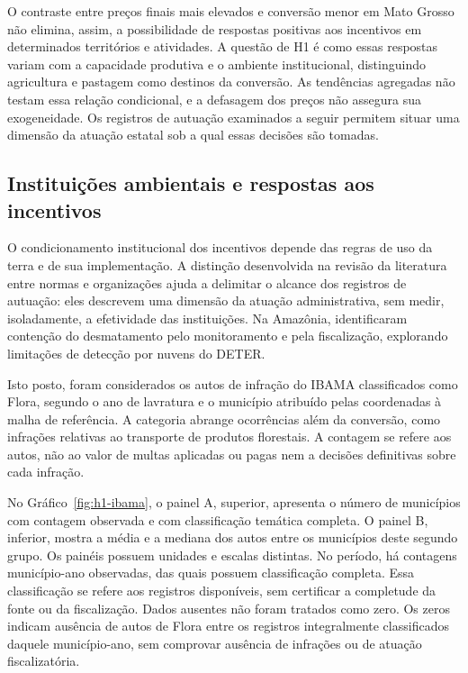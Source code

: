 O contraste entre preços finais mais elevados e conversão menor em Mato Grosso não elimina, assim, a possibilidade de respostas positivas aos incentivos em determinados territórios e atividades. A questão de H1 é como essas respostas variam com a capacidade produtiva e o ambiente institucional, distinguindo agricultura e pastagem como destinos da conversão. As tendências agregadas não testam essa relação condicional, e a defasagem dos preços não assegura sua exogeneidade. Os registros de autuação examinados a seguir permitem situar uma dimensão da atuação estatal sob a qual essas decisões são tomadas.

\FloatBarrier
\subsection{Instituições ambientais e respostas aos incentivos}
\label{descritiva-instituicoes}

O condicionamento institucional dos incentivos depende das regras de uso da terra e de sua implementação. A distinção desenvolvida na revisão da literatura entre normas e organizações ajuda a delimitar o alcance dos registros de autuação: eles descrevem uma dimensão da atuação administrativa, sem medir, isoladamente, a efetividade das instituições. Na Amazônia,  identificaram contenção do desmatamento pelo monitoramento e pela fiscalização, explorando limitações de detecção por nuvens do DETER. 

Isto posto, foram considerados os autos de infração do IBAMA \cite{IBAMA2026} classificados como Flora, segundo o ano de lavratura e o município atribuído pelas coordenadas à malha de referência. A categoria abrange ocorrências além da conversão, como infrações relativas ao transporte de produtos florestais. A contagem se refere aos autos, não ao valor de multas aplicadas ou pagas nem a decisões definitivas sobre cada infração.

No Gráfico~\ref{fig:h1-ibama}, o painel A, superior, apresenta o número de municípios com contagem observada e com classificação temática completa. O painel B, inferior, mostra a média e a mediana dos autos entre os municípios deste segundo grupo. Os painéis possuem unidades e escalas distintas. No período, há \HibValid{} contagens município-ano observadas, das quais \HibComplete{} possuem classificação completa. Essa classificação se refere aos registros disponíveis, sem certificar a completude da fonte ou da fiscalização. Dados ausentes não foram tratados como zero. Os zeros indicam ausência de autos de Flora entre os registros integralmente classificados daquele município-ano, sem comprovar ausência de infrações ou de atuação fiscalizatória.

